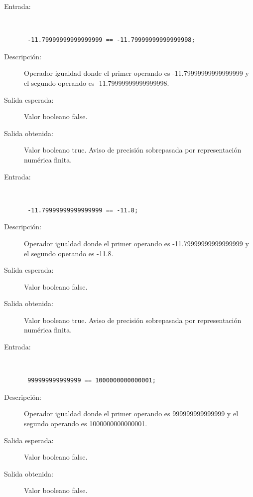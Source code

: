 \begin{framed}
	\begin{description}
		\item [Entrada:] \hfill \\
\begin{lstlisting}
 -11.79999999999999999 == -11.79999999999999998;
\end{lstlisting}
		\item [Descripción:] Operador igualdad donde el primer operando es -11.79999999999999999 y el segundo operando es  -11.79999999999999998.
		\item [Salida esperada:] Valor booleano false.
		\item [Salida obtenida:] Valor booleano true. Aviso de precisión sobrepasada por representación numérica finita.
	\end{description}
\end{framed}

\begin{framed}
	\begin{description}
		\item [Entrada:] \hfill \\
\begin{lstlisting}
 -11.79999999999999999 == -11.8;
\end{lstlisting}
		\item [Descripción:] Operador igualdad donde el primer operando es -11.79999999999999999 y el segundo operando es  -11.8.
		\item [Salida esperada:] Valor booleano false.
		\item [Salida obtenida:] Valor booleano true. Aviso de precisión sobrepasada por representación numérica finita.
	\end{description}
\end{framed}

\begin{framed}
	\begin{description}
		\item [Entrada:] \hfill \\
\begin{lstlisting}
 999999999999999 == 1000000000000001;
\end{lstlisting}
		\item [Descripción:] Operador igualdad donde el primer operando es 999999999999999 y el segundo operando es  1000000000000001.
		\item [Salida esperada:] Valor booleano false.
		\item [Salida obtenida:] Valor booleano false.
	\end{description}
\end{framed}

